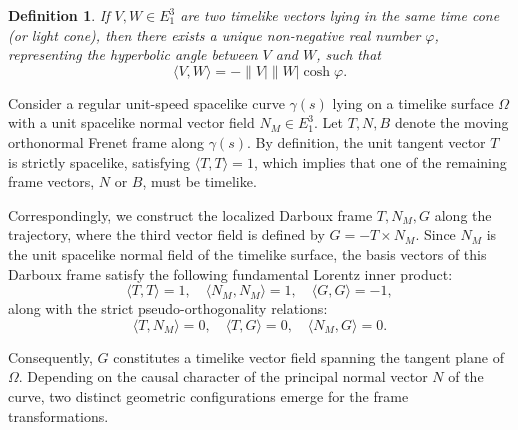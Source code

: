 \documentclass[reqno]{amsart}
\theoremstyle{plain}
\newtheorem{definition}{Definition}
\numberwithin{equation}{section}
\begin{document}
\begin{definition} \cite{7}
If $V,W\in E_{1}^{3}$ are two timelike vectors lying in the same time cone (or light cone), then there exists a unique non-negative real number $\varphi$, representing the hyperbolic angle between $V$ and $W$, such that 
\begin{equation*}
\langle V, W \rangle = -\|V| \|W| \cosh \varphi.
\end{equation*}
\end{definition}
Consider a regular unit-speed spacelike curve $\gamma(s)$ lying on a timelike surface $\Omega$ with a unit spacelike normal vector field $N_{M} \in E_{1}^{3}$. Let $T,N,B$ denote the moving orthonormal Frenet frame along $\gamma(s)$. By definition, the unit tangent vector $T$ is strictly spacelike, satisfying $\langle T,T \rangle = 1$, which implies that one of the remaining frame vectors, $N$ or $B$, must be timelike. 

Correspondingly, we construct the localized Darboux frame ${T,N_{M},G}$ along the trajectory, where the third vector field is defined by $G = -T \times N_{M}$. Since $N_{M}$ is the unit spacelike normal field of the timelike surface, the basis vectors of this Darboux frame satisfy the following fundamental Lorentz inner product:
\begin{equation}
\langle T, T \rangle = 1, \quad \langle N_{M}, N_{M} \rangle = 1, \quad \langle G, G \rangle = -1, \tag{2.2b}
\end{equation}
along with the strict pseudo-orthogonality relations:
\begin{equation}
\langle T, N_{M} \rangle = 0, \quad \langle T, G \rangle = 0, \quad \langle N_{M}, G \rangle = 0. \tag{2.2c}
\end{equation}

Consequently, $G$ constitutes a timelike vector field spanning the tangent plane of $\Omega$. Depending on the causal character of the principal normal vector $N$ of the curve, two distinct geometric configurations emerge for the frame transformations.


\end{document}
